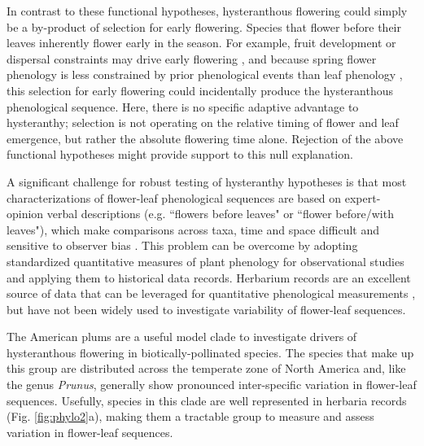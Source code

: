 \documentclass{article}[12pt]
\begin{document}
In contrast to these functional hypotheses, hysteranthous flowering could simply be a by-product of selection for early flowering. Species that flower before their leaves inherently flower early in the season. For example, fruit development or dispersal constraints may drive early flowering \citep{Primack1987}, and because spring flower phenology is less constrained by prior phenological events than leaf phenology \citep{Ettinger2018,Savage2019}, this selection for early flowering could incidentally produce the hysteranthous phenological sequence. Here, there is no specific adaptive advantage to hysteranthy;  selection is not operating on the relative timing of flower and leaf emergence, but rather the absolute flowering time alone. Rejection of the above functional hypotheses might provide support to this null explanation. 

\noindent A significant challenge for robust testing of hysteranthy hypotheses is that most characterizations of flower-leaf phenological sequences are based on expert-opinion verbal descriptions (e.g. ``flowers before leaves" or ``flower before/with leaves"), which make comparisons across taxa, time and space difficult and sensitive to observer bias  \citep[see][]{Buonaiuto2020}. This problem can be overcome by adopting standardized quantitative measures of plant phenology for observational studies and applying them to historical data records. Herbarium records are an excellent source of data that can be leveraged for quantitative phenological measurements \citep{Willis2017}, but have not been widely used to investigate variability of flower-leaf sequences.

\noindent The American plums %
are a useful model clade to investigate drivers of hysteranthous flowering in biotically-pollinated species. The species that make up this group are distributed across the temperate zone of North America and, like the genus \textit{Prunus}, generally show pronounced inter-specific variation in flower-leaf sequences. Usefully, species in this clade are well represented in herbaria records (Fig. \ref{fig:phylo2}a), making them a tractable group to measure and assess variation in flower-leaf sequences.
\end{document}
